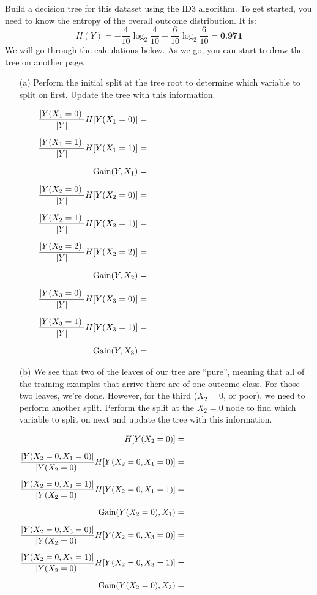 \begin{question}{}
Build a decision tree for this dataset using the ID3 algorithm. To get started, you need to know the entropy of the overall outcome distribution. It is:
$$ H(Y) = - \frac{4}{10} \log_2 \frac{4}{10} - \frac{6}{10} \log_2 \frac{6}{10} = \textbf{0.971} $$
We will go through the calculations below. As we go, you can start to draw the tree on another page.
\begin{enumerate}
\item[(a)] Perform the initial split at the tree root to determine which variable to split on first. Update the tree with this information.

\begin{align*}
\frac{|Y(X_1 = 0)|}{|Y|} H[Y(X_1 = 0)] &= \hspace{0.5\textwidth}\\[2mm]
\frac{|Y(X_1 = 1)|}{|Y|} H[Y(X_1 = 1)] &= \\[2mm]
\text{Gain}(Y, X_1) &= \\[2mm]
\frac{|Y(X_2 = 0)|}{|Y|} H[Y(X_2 = 0)] &= \\[2mm]
\frac{|Y(X_2 = 1)|}{|Y|} H[Y(X_2 = 1)] &= \\[2mm]
\frac{|Y(X_2 = 2)|}{|Y|} H[Y(X_2 = 2)] &= \\[2mm]
\text{Gain}(Y, X_2) &= \\[2mm]
\frac{|Y(X_3 = 0)|}{|Y|} H[Y(X_3 = 0)] &= \\[2mm]
\frac{|Y(X_3 = 1)|}{|Y|} H[Y(X_3 = 1)] &= \\[2mm]
\text{Gain}(Y, X_3) &= 
\end{align*}

\item[(b)] We see that two of the leaves of our tree are ``pure'', meaning that all of the training examples that arrive there are of one outcome class. For those two leaves, we're done. However, for the third ($X_2 = 0$, or poor), we need to perform another split. Perform the split at the $X_2=0$ node to find which variable to split on next and update the tree with this information. 

\begin{align*}
H[Y(X_2 = 0)] &= \\[2mm]
\frac{|Y(X_2 = 0, X_1 = 0)|}{|Y(X_2=0)|} H[Y(X_2 = 0, X_1 = 0)] &= \hspace{0.5\textwidth}\\[2mm]
\frac{|Y(X_2 = 0, X_1 = 1)|}{|Y(X_2=0)|} H[Y(X_2 = 0, X_1 = 1)] &= \hspace{0.5\textwidth}\\[2mm]
\text{Gain}(Y(X_2=0), X_1) &= \\[2mm]
\frac{|Y(X_2 = 0, X_3 = 0)|}{|Y(X_2=0)|} H[Y(X_2 = 0, X_3 = 0)] &= \hspace{0.5\textwidth}\\[2mm]
\frac{|Y(X_2 = 0, X_3 = 1)|}{|Y(X_2=0)|} H[Y(X_2 = 0, X_3 = 1)] &= \hspace{0.5\textwidth}\\[2mm]
\text{Gain}(Y(X_2=0), X_3) &= \\[2mm]
\end{align*}


\end{enumerate}
\end{question}
